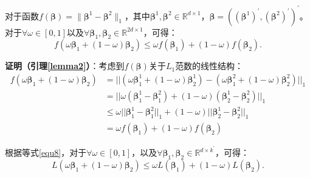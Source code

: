 \documentclass{NauThesis}
\begin{document}
\begin{lemma} \label{lemma2}
	对于函数$f(\boldsymbol{\beta})=\|\boldsymbol{\beta}^1-\boldsymbol{\beta}^2\|_1$，其中$\boldsymbol{\beta}^1,\boldsymbol{\beta}^2\in\mathbb{R}^{d\times1}$，$\boldsymbol{\beta}=((\boldsymbol{\beta}^1)^\prime,(\boldsymbol{\beta}^2)^\prime)^\prime$。对于$\forall\omega\in[0,1]$以及$\forall\boldsymbol{\beta}_1,\boldsymbol{\beta}_2\in\mathbb{R}^{2d\times1}$，可得：
	\begin{equation}
        f(\omega\boldsymbol{\beta}_1+(1-\omega)\boldsymbol{\beta}_2)\le\omega f(\boldsymbol{\beta}_1)+(1-\omega)f(\boldsymbol{\beta}_2).
    \end{equation}
\end{lemma}

\noindent \textbf{证明（引理\ref{lemma2}）}：考虑到$f(\boldsymbol{\beta})$关于$L_1$范数的线性结构：
$$\begin{aligned}
    f(\omega\boldsymbol{\beta}_1+(1-\omega)\boldsymbol{\beta}_2)&=||(\omega\boldsymbol{\beta}_1^1+(1-\omega)\boldsymbol{\beta}_2^1)-(\omega\boldsymbol{\beta}_1^2+(1-\omega)\boldsymbol{\beta}_2^2)||_1 \\
    &= ||\omega(\boldsymbol{\beta}_1^1-\boldsymbol{\beta}_1^2)+(1-\omega)(\boldsymbol{\beta}_2^1-\boldsymbol{\beta}_2^2)||_1 \\
    &\le \omega||\boldsymbol{\beta}_1^1-\boldsymbol{\beta}_1^2||_1+(1-\omega)||\boldsymbol{\beta}_2^1-\boldsymbol{\beta}_2^2||_1 \\
    &= \omega f(\boldsymbol{\beta}_1)+(1-\omega)f(\boldsymbol{\beta}_2)
    \end{aligned}$$

\begin{theorem} \label{thm1}
	根据等式\eqref{equ8}，对于$\forall\omega\in[0,1]$，以及$\forall\boldsymbol{\beta}_1,\boldsymbol{\beta}_2\in\mathbb{R}^{d\times k^\prime}$，可得：
    \begin{equation}
        L(\omega\boldsymbol{\beta}_1+(1-\omega)\boldsymbol{\beta}_2)\le\omega L(\boldsymbol{\beta}_1)+(1-\omega)L(\boldsymbol{\beta}_2).
    \end{equation}
\end{theorem}
\end{document}
